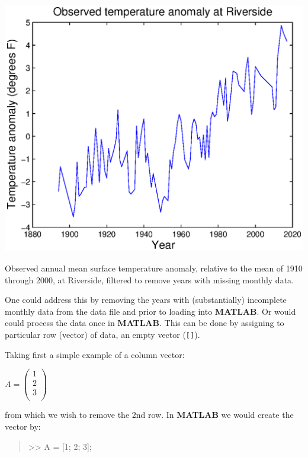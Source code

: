 \documentclass{tufte-book} %
\newenvironment{docspec}{\begin{quotation}\ttfamily\parskip0pt\parindent0pt\ignorespaces}{\end{quotation}}
\begin{document}
\begin{marginfigure}[0.0in]
\includegraphics[width=\linewidth]{ch1-plot-temperature7.eps}
\caption{Observed annual mean surface temperature anomaly, relative to the mean of 1910 through 2000, at Riverside, filtered to remove years with missing monthly data.}
\label{fig:ch1-plot-temperature7}
\end{marginfigure}

One could address this by removing the years with (substantially) incomplete monthly data from the data file and prior to loading into \textbf{MATLAB}. Or would could process the data once in \textbf{MATLAB}. This can be done by assigning to particular row (vector) of data, an empty vector (\texttt{[]}). 

Taking first a simple example of a column vector:

\vspace{2mm}
\(A=\begin{pmatrix}1 \\
2 \\
3 \\
\end{pmatrix}\)
\vspace{2mm}

\noindent from which we wish to remove the 2nd row. In \textbf{MATLAB} we would create the vector by:

\begin{docspec}
>> A = [1; 2; 3];
\end{docspec}
\end{document}
